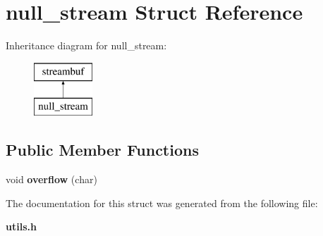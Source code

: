 \section{null\+\_\+stream Struct Reference}
\label{structnull__stream}
Inheritance diagram for null\+\_\+stream\+:\begin{figure}[H]
\begin{center}
\leavevmode
\includegraphics[height=2.000000cm]{structnull__stream}
\end{center}
\end{figure}
\subsection*{Public Member Functions}
\begin{DoxyCompactItemize}
\item 
void {\bfseries overflow} (char)\label{structnull__stream_a0bbaf9ee51c3dbe2583d3f2c0dfaeefb}

\end{DoxyCompactItemize}


The documentation for this struct was generated from the following file\+:\begin{DoxyCompactItemize}
\item 
{\bf utils.\+h}\end{DoxyCompactItemize}
